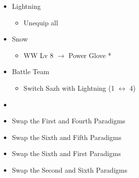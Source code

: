 \begin{multicols}{2}
\begin{menu}
\begin{itemize}
\begin{itemize}
			\end{itemize}
			\equip
			\begin{itemize}
				\item Lightning
				      \begin{itemize}
					      \item Unequip all
				      \end{itemize}
				\item Snow
				      \begin{itemize}
					      \item WW Lv 8 $\rightarrow$ Power Glove *
				      \end{itemize}
			\end{itemize}
			\paradigm
			\begin{itemize}
				\item Battle Team
				      \begin{itemize}
					      \item Switch Sazh with Lightning (1 $\leftrightarrow$ 4)
				      \end{itemize}
				\item {}%
				      {\paradigmline{\com}{\sen}{\med}}%
				      {\paradigmline{(\rav)}{\rav}{\rav}}%
				      {\paradigmline{(\rav)}{\sen}{(\rav)}}%
				      {\paradigmline[4]{\textit{(\com)}}{\textit{\com}}{\textit{(\com)}}}%
				      {\paradigmline{\rav}{\com}{(\com)}}%
				      {\paradigmline{\rav}{\com}{(\rav)}}
				\item Swap the First and Fourth Paradigms
				\item Swap the Sixth and Fifth Paradigms
				\item Swap the Sixth and First Paradigms
				\item Swap the Second and Sixth Paradigms
			\end{itemize}
		\end{itemize}
	\end{menu}
\end{multicols}

